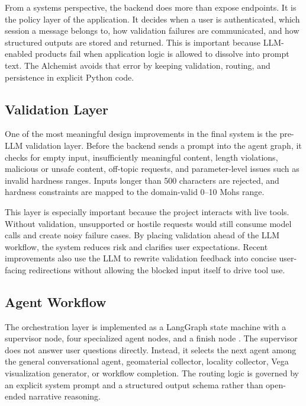 \documentclass[12pt,oneside]{report}
\begin{document}
From a systems perspective, the backend does more than expose endpoints. It is the policy layer of the application. It decides when a user is authenticated, which session a message belongs to, how validation failures are communicated, and how structured outputs are stored and returned. This is important because LLM-enabled products fail when application logic is allowed to dissolve into prompt text. The Alchemist avoids that error by keeping validation, routing, and persistence in explicit Python code.

\subsection{Validation Layer}

One of the most meaningful design improvements in the final system is the pre-LLM validation layer. Before the backend sends a prompt into the agent graph, it checks for empty input, insufficiently meaningful content, length violations, malicious or unsafe content, off-topic requests, and parameter-level issues such as invalid hardness ranges. Inputs longer than 500 characters are rejected, and hardness constraints are mapped to the domain-valid 0--10 Mohs range.

This layer is especially important because the project interacts with live tools. Without validation, unsupported or hostile requests would still consume model calls and create noisy failure cases. By placing validation ahead of the LLM workflow, the system reduces risk and clarifies user expectations. Recent improvements also use the LLM to rewrite validation feedback into concise user-facing redirections without allowing the blocked input itself to drive tool use.

\subsection{Agent Workflow}

The orchestration layer is implemented as a LangGraph state machine with a supervisor node, four specialized agent nodes, and a finish node \citep{langchain,langgraph}. The supervisor does not answer user questions directly. Instead, it selects the next agent among the general conversational agent, geomaterial collector, locality collector, Vega visualization generator, or workflow completion. The routing logic is governed by an explicit system prompt and a structured output schema rather than open-ended narrative reasoning.
\end{document}
